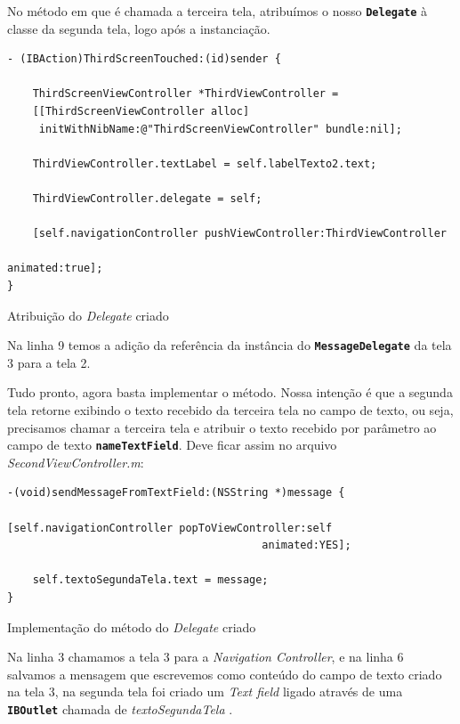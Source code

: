 \documentclass[a4paper,12pt,brazil,doubleside]{book}
\begin{document}
\begin{singlespace}
No método em que é chamada a terceira tela, atribuímos o nosso \texttt{\textbf{Delegate}} à classe da segunda tela, logo após a instanciação.

\begin{listing}[H]
\begin{verbatim}
- (IBAction)ThirdScreenTouched:(id)sender {

    ThirdScreenViewController *ThirdViewController =
    [[ThirdScreenViewController alloc]
     initWithNibName:@"ThirdScreenViewController" bundle:nil];
    
    ThirdViewController.textLabel = self.labelTexto2.text;
    
    ThirdViewController.delegate = self;
    
    [self.navigationController pushViewController:ThirdViewController 
    													animated:true];
}
\end{verbatim}
\caption{Atribuição do \emph{Delegate} criado}
\end{listing}


Na linha 9 temos a adição da referência da instância do \texttt{\textbf{MessageDelegate}} da tela 3 para a tela 2.

Tudo pronto, agora basta implementar o método. Nossa intenção é que a segunda tela retorne exibindo o texto recebido da terceira tela no campo de texto, ou seja, precisamos chamar a terceira tela e atribuir o texto recebido por parâmetro ao campo de texto \texttt{\textbf{nameTextField}}. Deve ficar assim no arquivo \emph{SecondViewController.m}:

\begin{listing}[H]
\begin{verbatim}
-(void)sendMessageFromTextField:(NSString *)message { 

[self.navigationController popToViewController:self 
										animated:YES];
										
    self.textoSegundaTela.text = message;
}
\end{verbatim}
\caption{Implementação do método do \emph{Delegate} criado}
\end{listing}


Na linha 3 chamamos a tela 3 para a \emph{Navigation Controller}, e na linha 6 salvamos a mensagem que escrevemos como conteúdo do campo de texto criado na tela 3, na segunda tela foi criado um \emph{Text field} ligado através de uma \texttt{\textbf{IBOutlet}} chamada de \emph{textoSegundaTela} .


\end{singlespace}
\end{document}
